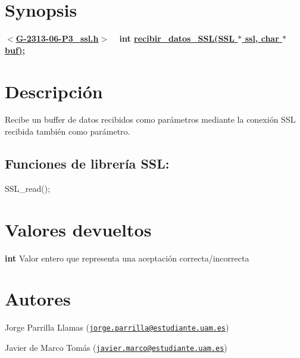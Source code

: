 \hypertarget{recibir_datos_SSL_synopsis_5}{}\section{Synopsis}\label{recibir_datos_SSL_synopsis_5}
{ {\bfseries $<$\hyperlink{G-2313-06-P3__ssl_8h}{G-\/2313-\/06-\/\+P3\+\_\+ssl.\+h}$>$} ~\newline
 {\bfseries int \hyperlink{G-2313-06-P3__ssl_8c_af7dca116c6dbb68e9609293102c208c5}{recibir\+\_\+datos\+\_\+\+S\+S\+L(\+S\+S\+L $\ast$ ssl, char $\ast$buf)};} } \hypertarget{recibir_datos_SSL_descripcion_5}{}\section{Descripción}\label{recibir_datos_SSL_descripcion_5}
Recibe un buffer de datos recibidos como parámetros mediante la conexión S\+SL recibida también como parámetro. ~\newline
\subsection*{{\bfseries Funciones de librería S\+SL\+:}}


\begin{DoxyItemize}
\item S\+S\+L\+\_\+read(); 
\end{DoxyItemize}\hypertarget{recibir_datos_SSL_return_5}{}\section{Valores devueltos}\label{recibir_datos_SSL_return_5}

\begin{DoxyItemize}
\item {\bfseries int} Valor entero que representa una aceptación correcta/incorrecta 
\end{DoxyItemize}\hypertarget{recibir_datos_SSL_authors_5}{}\section{Autores}\label{recibir_datos_SSL_authors_5}

\begin{DoxyItemize}
\item Jorge Parrilla Llamas (\href{mailto:jorge.parrilla@estudiante.uam.es}{\tt jorge.\+parrilla@estudiante.\+uam.\+es}) 
\item Javier de Marco Tomás (\href{mailto:javier.marco@estudiante.uam.es}{\tt javier.\+marco@estudiante.\+uam.\+es}) 
\end{DoxyItemize}